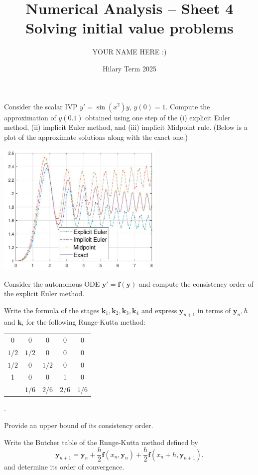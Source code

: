 \documentclass[answers]{exam}
\title{Numerical Analysis -- Sheet 4\\Solving initial value problems}
\author{YOUR NAME HERE :)}
\date{Hilary Term 2025}
\begin{document}
\maketitle

\begin{questions}

\question%
Consider the scalar IVP $y'=\sin(x^2) y$, $y(0)=1$. Compute the approximation of $y(0.1)$ obtained using one step of the (i) explicit Euler method, (ii) implicit Euler method, and (iii) implicit Midpoint rule. (Below is a plot of the approximate solutions along with the exact one.)
\begin{center}\includegraphics[width=8cm]{sheet 4 q 1}\end{center}



\question%
Consider the autonomous ODE $\mathbf{y}'=\mathbf{f}(\mathbf{y})$ and compute the consistency order of the explicit Euler method.



\question%
Write the formula of the stages $\mathbf{k}_{1}, \mathbf{k}_{2}, \mathbf{k}_{3}, \mathbf{k}_{4}$ and express $\mathbf{y}_{n+1}$ in terms of $\mathbf{y}_{n}, h$ and $\mathbf{k}_{i}$ for the following Runge-Kutta method: \begin{center}\begin{tabular}{c|cccc}
	0 & 0 & 0 & 0 & 0 \\
	$1 / 2$ & $1 / 2$ & 0 & 0 & 0 \\
	$1 / 2$ & 0 & $1 / 2$ & 0 & 0 \\
	1 & 0 & 0 & 1 & 0 \\\hline
	 & $1 / 6$ & $2 / 6$ & $2 / 6$ & $1 / 6$
\end{tabular}.\end{center} Provide an upper bound of its consistency order.



\question%
Write the Butcher table of the Runge-Kutta method defined by \[
	\mathbf{y}_{n+1}=\mathbf{y}_{n}+\frac{h}{2} \mathbf{f}(x_{n}, \mathbf{y}_{n})+\frac{h}{2} \mathbf{f}(x_{n}+h, \mathbf{y}_{n+1}) .
\] and determine its order of convergence.




\end{questions}
\end{document}
